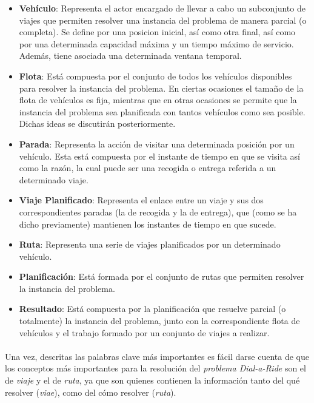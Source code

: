 \documentclass{subfiles}
\begin{document}
\begin{itemize}
          \item \textbf{Vehículo}: Representa el actor encargado de llevar a cabo un subconjunto de viajes que permiten resolver una instancia del problema de manera parcial (o completa). Se define por una posicion inicial, así como otra final, así como por una determinada capacidad máxima y un tiempo máximo de servicio. Además, tiene asociada una determinada ventana temporal.

          \item \textbf{Flota}: Está compuesta por el conjunto de todos los vehículos disponibles para resolver la instancia del problema. En ciertas ocasiones el tamaño de la flota de vehículos es fija, mientras que en otras ocasiones se permite que la instancia del problema sea planificada con tantos vehículos como sea posible. Dichas ideas se discutirán posteriormente.

          \item \textbf{Parada}: Representa la acción de visitar una determinada posición por un vehículo. Esta está compuesta por el instante de tiempo en que se visita así como la razón, la cual puede ser una recogida o entrega referida a un determinado viaje.

          \item \textbf{Viaje Planificado}: Representa el enlace entre un viaje y sus dos correspondientes paradas (la de recogida y la de entrega), que (como se ha dicho previamente) mantienen los instantes de tiempo en que sucede.

          \item \textbf{Ruta}: Representa una serie de viajes planificados por un determinado vehículo.

          \item \textbf{Planificación}: Está formada por el conjunto de rutas que permiten resolver la instancia del problema.

          \item \textbf{Resultado}: Está compuesta por la planificación que resuelve parcial (o totalmente) la instancia del problema, junto con la correspondiente flota de vehículos y el trabajo formado por un conjunto de viajes a realizar.

        \end{itemize}

        \paragraph{}
        Una vez, descritas las palabras clave más importantes es fácil darse cuenta de que los conceptos más importantes para la resolución del \emph{problema Dial-a-Ride} son el de \emph{viaje} y el de \emph{ruta}, ya que son quienes contienen la información tanto del qué resolver (\emph{viae}), como del cómo resolver (\emph{ruta}).
\end{document}
